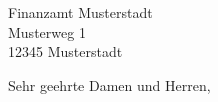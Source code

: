 \documentclass{scrlttr2}
\begin{document}
\begin{letter}{Finanzamt Musterstadt \\ Musterweg 1 \\ 12345 Musterstadt}
\opening{Sehr geehrte Damen und Herren,}
 
\end{letter}
\end{document}

